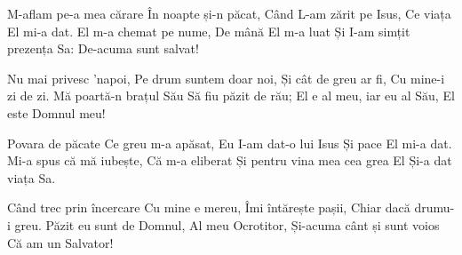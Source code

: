 \beginverse
M-aflam pe-a mea cărare
În noapte și-n păcat,
Când L-am zărit pe Isus,
Ce viața El mi-a dat.
El m-a chemat pe nume,
De mână El m-a luat
Și I-am simțit prezența Sa:
De-acuma sunt salvat!
\endverse

\beginchorus
Nu mai privesc 'napoi,
Pe drum suntem doar noi,
Și cât de greu ar fi,
Cu mine-i zi de zi.
Mă poartă-n brațul Său
Să fiu păzit de rău;
El e al meu, iar eu al Său,
El este Domnul meu!
\endchorus

\beginverse
Povara de păcate
Ce greu m-a apăsat,
Eu I-am dat-o lui Isus
Și pace El mi-a dat.
Mi-a spus că mă iubește,
Că m-a eliberat
Și pentru vina mea cea grea
El Și-a dat viața Sa.
\endverse

\beginverse
Când trec prin încercare
Cu mine e mereu,
Îmi întărește pașii,
Chiar dacă drumu-i greu.
Păzit eu sunt de Domnul,
Al meu Ocrotitor,
Și-acuma cânt și sunt voios
Că am un Salvator!
\endverse
\endsong
